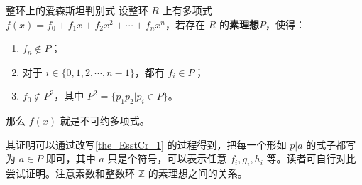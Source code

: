 \begin{theorem}{整环上的爱森斯坦判别式}
设整环 $R$ 上有多项式 $f(x)=f_0+f_1x+f_2x^2+\cdots+f_nx^n$，若存在 $R$ 的\textbf{素理想}$P$，使得：
\begin{enumerate}
\item $f_n\not\in P$；
\item 对于 $i\in\{0, 1, 2, \cdots, n-1\}$，都有 $f_i\in P$；
\item $f_0\not\in P^2$，其中 $P^2=\{p_1p_2|p_i\in P\}$。
\end{enumerate}
那么 $f(x)$ 就是不可约多项式。
\end{theorem}

其证明可以通过改写\autoref{the_EsstCr_1} 的过程得到，把每一个形如 $p|a$ 的式子都写为 $a\in P$ 即可，其中 $a$ 只是个符号，可以表示任意 $f_i, g_i, h_i$ 等。读者可自行对比尝试证明。注意素数和整数环 $\mathbb{Z}$ 的素理想之间的关系。





